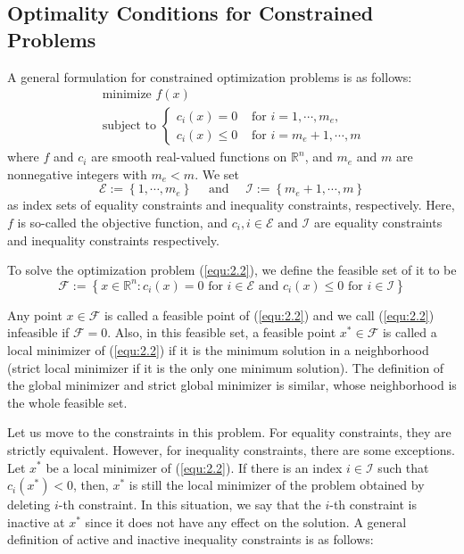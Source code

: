 \subsection{Optimality Conditions for Constrained Problems}
A general formulation for constrained optimization problems is as follows: 
\begin{equation}
\label{equ:2.2}
\begin{array}{l}\textrm { minimize } f(x) \\ \textrm { subject to }\left\{\begin{array}{ll}c_{i}(x)=0 & \textrm { for } i=1, \cdots, m_{e}, \\ c_{i}(x) \leq 0 & \textrm { for } i=m_{e}+1, \cdots, m\end{array}\right.\end{array}
\end{equation}
where $f$ and $c_i$ are smooth real-valued functions on $\mathbb{R}^n$, and $m_e$ and $m$ are nonnegative integers with $m_e < m$. We set 
$$
\mathscr{E}:=\left\{1, \cdots, m_{e}\right\} \quad \textrm { and } \quad \mathscr{I}:=\left\{m_{e}+1, \cdots, m\right\}
$$
as index sets of equality constraints and inequality constraints, respectively. Here, $f$ is so-called the objective function, and $c_i, i \in \mathscr{E} \textrm{ and } \mathscr{I}$ are equality constraints and inequality constraints respectively. 
\par To solve the optimization problem (\ref{equ:2.2}), we define the feasible set of it to be
$$
\mathscr{F}:=\left\{x \in \mathbb{R}^{n}: c_{i}(x)=0 \textrm { for } i \in \mathscr{E} \textrm { and } c_{i}(x) \leq 0 \textrm { for } i \in \mathscr{I}\right\}
$$
\par Any point $x \in \mathscr{F}$ is called a feasible point of (\ref{equ:2.2}) and we call (\ref{equ:2.2}) infeasible if $\mathscr{F} = 0$. Also, in this feasible set, a feasible point $x^* \in \mathscr{F}$ is called a local minimizer of (\ref{equ:2.2}) if it is the minimum solution in a neighborhood (strict local minimizer if it is the only one minimum solution). The definition of the global minimizer and strict global minimizer is similar, whose neighborhood is the whole feasible set. 
\par Let us move to the constraints in this problem. For equality constraints, they are strictly equivalent. However, for inequality constraints, there are some exceptions. Let $x^*$ be a local minimizer of (\ref{equ:2.2}). If there is an index $i \in \mathscr{I}$ such that $c_i(x^*) < 0$, then, $x^*$ is still the local minimizer of the problem obtained by deleting $i$-th constraint. In this situation, we say that the $i$-th constraint is inactive at $x^*$ since it does not have any effect on the solution. A general definition of active and inactive inequality constraints is as follows:

